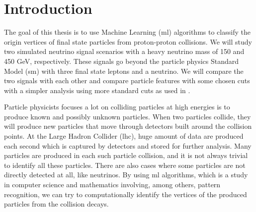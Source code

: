 \documentclass[a4paper, american, 12pt]{report}
\begin{document}
	\listoftables{}
	
	\lstlistoflistings{}
	
	

	\chapter{Introduction}
	\label{chap:Intro}
	The goal of this thesis is to use Machine Learning (\acrshort{ml}) algorithms to classify the origin vertices of final state particles from proton-proton collisions. We will study two simulated neutrino signal scenarios with a heavy neutrino mass of 150 and 450 GeV, respectively. These signals go beyond the particle physics Standard Model (\acrshort{sm}) with three final state leptons and a neutrino. We will compare the two signals with each other and compare particle features with some chosen cuts with a simpler analysis using more standard cuts as used in \citet{inverseseesaw}.
	
	Particle physicists focuses a lot on colliding particles at high energies is to produce known and possibly unknown particles. When two particles collide, they will produce new particles that move through detectors built around the collision points. At the Large Hadron Collider (\acrshort{lhc}), huge amount of data are produced each second which is captured by detectors and stored for further analysis. Many particles are produced in each such particle collision, and it is not always trivial to identify all these particles. There are also cases where some particles are not directly detected at all, like neutrinos. By using \acrshort{ml} algorithms, which is a study in computer science and mathematics involving, among others, pattern recognition, we can try to computationally identify the vertices of the produced particles from the collision decays. 
	
\end{document}
